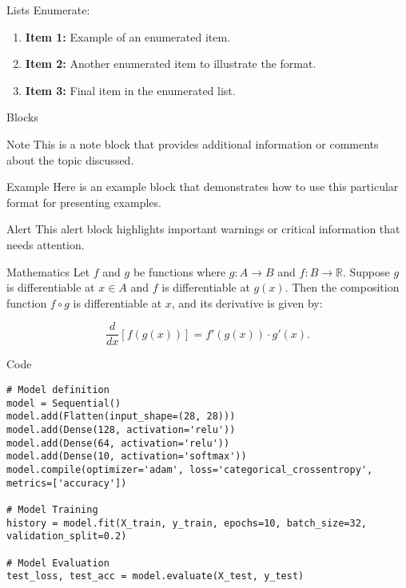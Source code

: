 \documentclass[12pt]{beamer}
\begin{document}
\begin{frame}[allowframebreaks]{Lists}
Enumerate:

\begin{enumerate}
    \item \textbf{Item 1:} Example of an enumerated item.
    \item \textbf{Item 2:} Another enumerated item to illustrate the format.
    \item \textbf{Item 3:} Final item in the enumerated list.
\end{enumerate}
\end{frame}

\begin{frame}[allowframebreaks]{Blocks}
\begin{block}{Note}
This is a note block that provides additional information or comments about the topic discussed.
\end{block}

\begin{exampleblock}{Example}
Here is an example block that demonstrates how to use this particular format for presenting examples.
\end{exampleblock}

\begin{alertblock}{Alert}
This alert block highlights important warnings or critical information that needs attention.
\end{alertblock}
\end{frame}

\begin{frame}[allowframebreaks]{Mathematics}
Let $f$ and $g$ be functions where $g: A \to B$ and $f: B \to \mathbb{R}$. Suppose $g$ is differentiable at $x \in A$ and $f$ is differentiable at $g(x)$. Then the composition function $f \circ g$ is differentiable at $x$, and its derivative is given by:

\begin{equation}
\frac{d}{dx} \left[ f(g(x)) \right] = f'(g(x)) \cdot g'(x).
\label{eq:1}
\end{equation}
\end{frame}

\begin{frame}{Code}
\lstset{style=py}
\begin{lstlisting}
# Model definition
model = Sequential()
model.add(Flatten(input_shape=(28, 28)))
model.add(Dense(128, activation='relu'))
model.add(Dense(64, activation='relu'))
model.add(Dense(10, activation='softmax'))
model.compile(optimizer='adam', loss='categorical_crossentropy', metrics=['accuracy'])

# Model Training
history = model.fit(X_train, y_train, epochs=10, batch_size=32, validation_split=0.2)

# Model Evaluation
test_loss, test_acc = model.evaluate(X_test, y_test)
\end{lstlisting}
\end{frame}
\end{document}
